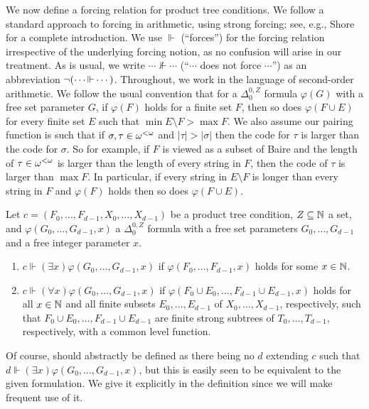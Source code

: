 We now define a forcing relation for product tree conditions. We follow a standard approach to forcing in arithmetic, using strong forcing; see, e.g., Shore \cite[Chapter 3]{Shore-2016} for a complete introduction. We use $\Vdash$ (``forces'') for the forcing relation irrespective of the underlying forcing notion, as no confusion will arise in our treatment. As is usual, we write $\cdots \not\Vdash \cdots$ (``$\cdots$ does not force $\cdots$'') as an abbreviation $\neg ( \cdots {\Vdash} \cdots)$. Throughout, we work in the language of second-order arithmetic. We follow the usual convention that for a $\Delta^{0,Z}_0$ formula $\varphi(G)$ with a free set parameter $G$, if $\varphi(F)$ holds for a finite set $F$, then so does $\varphi(F \cup E)$ for every finite set $E$ such that $\min E \setminus F > \max F$. We also assume our pairing function is such that if $\sigma,\tau \in {\omega^{<\omega}}$ and $|\tau| > |\sigma|$ then the code for $\tau$ is larger than the code for $\sigma$. So for example, if $F$ is viewed as a subset of Baire and the length of $\tau \in {\omega^{<\omega}}$ is larger than the length of every string  in $F$, then the code of $\tau$ is larger than $\max F$. In particular, if every string in $E \setminus F$ is longer than every string in $F$ and $\varphi(F)$ holds then so does $\varphi(F \cup E)$.

\begin{definition}\label{def:product-tree-forcing-relation}
Let $c = (F_0, \dots, F_{d-1}, X_0, \dots, X_{d-1})$ be a product tree condition, $Z \subseteq \mathbb{N}$ a set, and $\varphi(G_0, \dots, G_{d-1}, x)$ a $\Delta^{0,Z}_0$ formula with a free set parameters $G_0, \dots, G_{d-1}$ and a free integer parameter $x$.
\begin{enumerate}
	\item\label{force:exists} $c \Vdash (\exists x)\varphi(G_0, \dots, G_{d-1}, x)$ if $\varphi(F_0, \dots, F_{d-1}, x)$ holds for some $x \in \mathbb{N}$.
	\item\label{force:forall} $c \Vdash (\forall x)\varphi(G_0, \dots, G_{d-1}, x)$ if $\varphi(F_0 \cup E_0, \dots, F_{d-1} \cup E_{d-1}, x)$ holds for all $x \in \mathbb{N}$ and all finite subsets $E_0,\ldots,E_{d-1}$ of $X_0,\ldots,X_{d-1}$, respectively, such that $F_0 \cup E_0, \dots, F_{d-1} \cup E_{d-1}$ are finite strong subtrees of $T_0, \dots, T_{d-1}$, respectively, with a common level function.
\end{enumerate}
\end{definition}

\noindent Of course,  should abstractly be defined as there being no $d$ extending $c$ such that  $d \Vdash (\exists x) \varphi(G_0,\ldots,G_{d-1},x)$, but this is easily seen to be equivalent to the given formulation. We give it explicitly in the definition since we will make frequent use of it.

